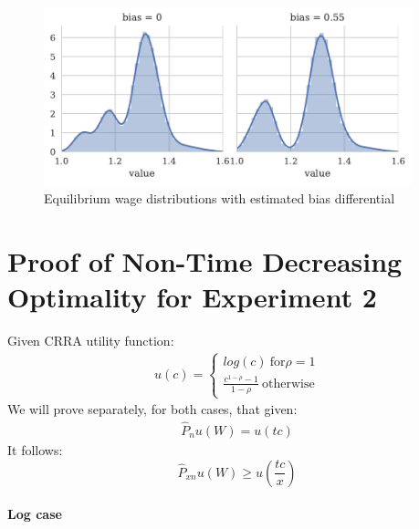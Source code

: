 \documentclass[a4paper,12pt]{article}
\begin{document}
\begin{appendices}
\begin{figure}[h]
    \centering
    \includegraphics[width=0.95\textwidth]{../equilibrium/wage-distributions}
    \caption{Equilibrium wage distributions with estimated bias differential}
    \label{fig:wage-distributions}
\end{figure}

\newpage

\section{Proof of Non-Time Decreasing Optimality for Experiment 2}
\label{appendix:proof}

Given CRRA utility function:
\begin{align*}
u(c) =
  \begin{cases}
    log(c) \ \text{for} \rho = 1 \\
    \frac{c^{1 - \rho} - 1}{1 - \rho} \ \text{otherwise}
  \end{cases}
\end{align*}
%
We will prove separately, for both cases, that given:
\begin{align*}
  \hat{P}_{n}u(W) = u(tc)
\end{align*}
It follows:
\begin{equation} \label{proof:ineq}
  \hat{P}_{xn}u(W) \geq u(\frac{tc}{x})
\end{equation}
%
\paragraph{Log case}


\end{appendices}
\end{document}
